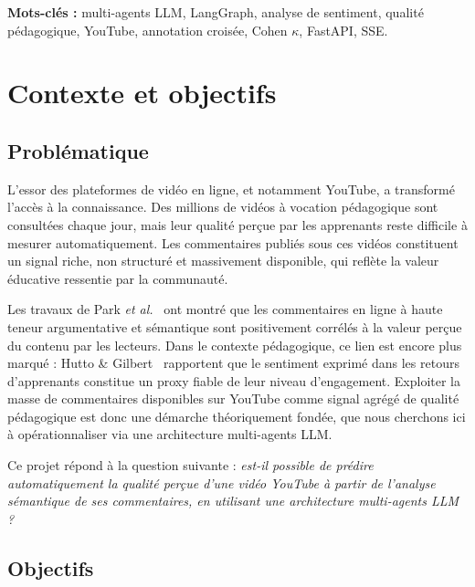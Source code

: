 \documentclass[12pt, a4paper]{article}
\begin{document}
\vspace{0.8cm}
\noindent\textbf{Mots-clés :} multi-agents LLM, LangGraph, analyse de sentiment,
qualité pédagogique, YouTube, annotation croisée, Cohen $\kappa$, FastAPI, SSE.

\vfill

\tableofcontents
\newpage

\section{Contexte et objectifs}

\subsection{Problématique}

L'essor des plateformes de vidéo en ligne, et notamment YouTube, a transformé
l'accès à la connaissance. Des millions de vidéos à vocation pédagogique sont
consultées chaque jour, mais leur qualité perçue par les apprenants reste difficile
à mesurer automatiquement. Les commentaires publiés sous ces vidéos constituent
un signal riche, non structuré et massivement disponible, qui reflète la valeur
éducative ressentie par la communauté.

Les travaux de Park \textit{et al.}~\cite{park2016comment} ont montré que les
commentaires en ligne à haute teneur argumentative et sémantique sont positivement
corrélés à la valeur perçue du contenu par les lecteurs. Dans le contexte
pédagogique, ce lien est encore plus marqué : Hutto \& Gilbert~\cite{hutto2014vader}
rapportent que le sentiment exprimé dans les retours d'apprenants constitue
un proxy fiable de leur niveau d'engagement. Exploiter la masse de commentaires
disponibles sur YouTube comme signal agrégé de qualité pédagogique est donc
une démarche théoriquement fondée, que nous cherchons ici à opérationnaliser
via une architecture multi-agents LLM.

Ce projet répond à la question suivante : \textit{est-il possible de prédire
automatiquement la qualité perçue d'une vidéo YouTube à partir de l'analyse
sémantique de ses commentaires, en utilisant une architecture multi-agents LLM ?}

\subsection{Objectifs}
\end{document}
